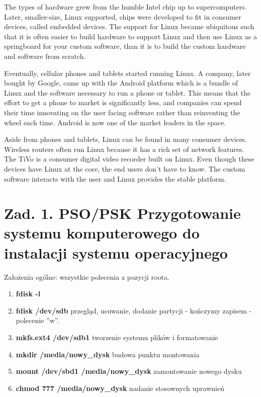 \documentclass[a4paper,titlepage,12pt]{mwart}
\begin{document}
The types of hardware grew from the humble Intel chip up to supercomputers. Later, smaller-size, Linux supported, chips were developed to fit in consumer devices, called embedded devices. The support for Linux became ubiquitous such that it is often easier to build hardware to support Linux and then use Linux as a springboard for your custom software, than it is to build the custom hardware and software from scratch.

Eventually, cellular phones and tablets started running Linux. A company, later bought by Google, came up with the Android platform which is a bundle of Linux and the software necessary to run a phone or tablet. This means that the effort to get a phone to market is significantly less, and companies can spend their time innovating on the user facing software rather than reinventing the wheel each time. Android is now one of the market leaders in the space.

Aside from phones and tablets, Linux can be found in many consumer devices. Wireless routers often run Linux because it has a rich set of network features. The TiVo is a consumer digital video recorder built on Linux. Even though these devices have Linux at the core, the end users don’t have to know. The custom software interacts with the user and Linux provides the stable platform.
\section{Zad. 1. PSO/PSK Przygotowanie systemu komputerowego do instalacji systemu operacyjnego}
Założenia ogólne: wszystkie polecenia z pozycji roota.
\begin{enumerate}
\item{\textbf{fdisk -l}}
\item{\textbf{fdisk /dev/sdb}\newline
	przegląd, usuwanie, dodanie partycji - kończymy zapisem - polecenie ''w''.}
\item{\textbf{mkfs.ext4 /dev/sdb1}\newline
	tworzenie systemu plików i formatowanie}
\item{\textbf{mkdir /media/nowy\_dysk}\newline
	budowa punktu montowania}
\item{\textbf{mount /dev/sbd1 /media/nowy\_dysk}\newline
	zamontowanie nowego dysku}
\item{\textbf{chmod 777 /media/nowy\_dysk}\newline
	nadanie stosownych uprawnień}
\end{enumerate}
\end{document}
